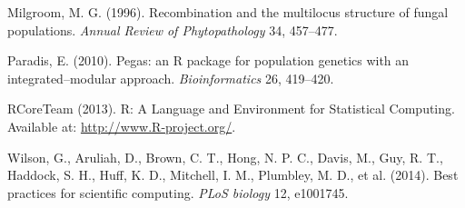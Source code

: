 \documentclass{frontiersSCNS} %
\begin{document}
Milgroom, M. G. (1996). Recombination and the multilocus structure of
fungal populations. \emph{Annual Review of Phytopathology} 34, 457--477.

Paradis, E. (2010). Pegas: an R package for population genetics with an
integrated--modular approach. \emph{Bioinformatics} 26, 419--420.

RCoreTeam (2013). R: A Language and Environment for Statistical
Computing. Available at: \url{http://www.R-project.org/}.

Wilson, G., Aruliah, D., Brown, C. T., Hong, N. P. C., Davis, M., Guy,
R. T., Haddock, S. H., Huff, K. D., Mitchell, I. M., Plumbley, M. D., et
al. (2014). Best practices for scientific computing. \emph{PLoS biology}
12, e1001745.
\end{document}
